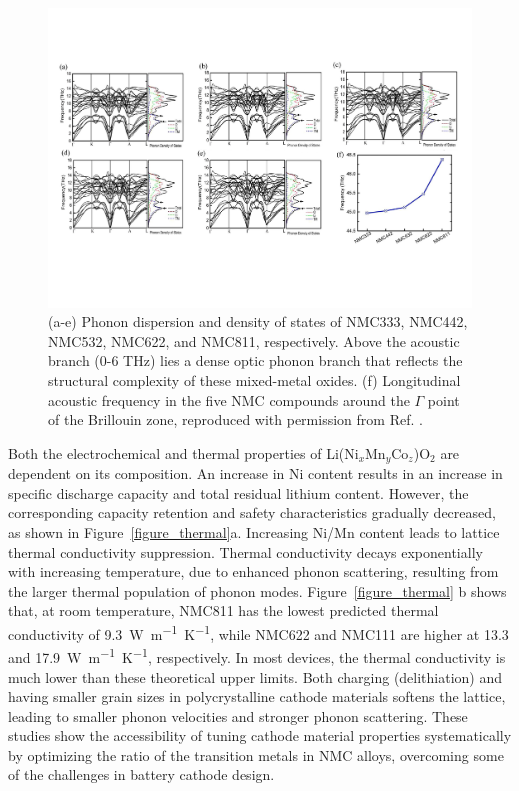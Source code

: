\documentclass[journal=jacsat,manuscript=article]{achemso}
\begin{document}
\begin{figure}[]
  \centering
    \includegraphics[width=14cm]{Figures/P_phonon_2.pdf}
    \caption{(a-e) Phonon dispersion and density of states of NMC333, NMC442, NMC532, NMC622, and NMC811, respectively. Above the acoustic branch (0-6 THz) lies a dense optic phonon branch that reflects the structural complexity of these mixed-metal oxides. 
    (f) Longitudinal acoustic frequency in the five NMC compounds around the $\Gamma$ point of the Brillouin zone, reproduced with permission from Ref. .}
  \label{figure_phonon}
\end{figure}

Both the electrochemical and thermal properties of Li(Ni$_x$Mn$_y$Co$_z$)O$_2$ are dependent on its composition. 
An increase in Ni content results in an increase in speciﬁc discharge capacity and total residual lithium content.
However, the corresponding capacity retention and safety characteristics gradually decreased, as shown in Figure~\ref{figure_thermal}a.\cite{noh2013comparison} 
Increasing Ni/Mn content leads to lattice thermal conductivity suppression.\cite{yang2020chemical}
Thermal conductivity decays exponentially with increasing temperature, due to enhanced phonon scattering, resulting from the larger thermal population of phonon modes.
Figure~\ref{figure_thermal} b shows that, at room temperature, NMC811 has the lowest predicted thermal conductivity of \SI{9.3}{W.m^{-1}.K^{-1}}, while NMC622 and NMC111 are higher at 13.3 and \SI{17.9}{W.m^{-1}.K^{-1}}, respectively.
In most devices, the thermal conductivity is much lower than these theoretical upper limits.\cite{takahata2002thermal,chen2006thermal}
Both charging (delithiation) and having smaller grain sizes in polycrystalline cathode materials softens the lattice, leading to smaller phonon velocities and stronger phonon scattering.\cite{feng2020quantum,xia2020high}
These studies show the accessibility of tuning cathode material properties systematically by optimizing the ratio of the transition metals in NMC alloys, overcoming some of the challenges in battery cathode design.
\end{document}

